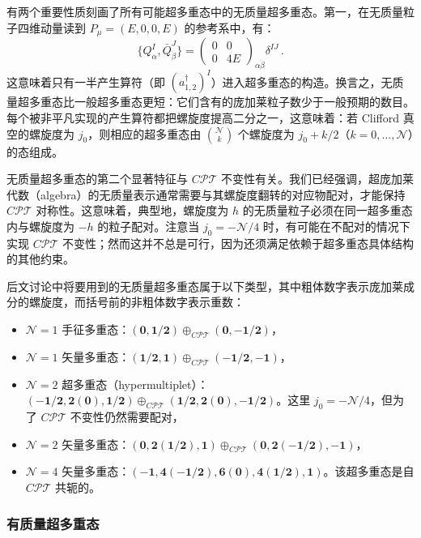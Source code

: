 有两个重要性质刻画了所有可能超多重态中的无质量超多重态。第一，在无质量粒子四维动量读到 $P_\mu=(E,0,0,E)$ 的参考系中，有：
\[
\{Q^I_\alpha,\bar Q^J_{\dot\beta}\}=\begin{pmatrix}0&0\\ 0&4E\end{pmatrix}_{\alpha\dot\beta}\delta^{IJ}\,.
\]
这意味着只有一半产生算符（即 $(a^\dagger_{1,2})^I$）进入超多重态的构造。换言之，无质量超多重态比一般超多重态更短：它们含有的庞加莱粒子数少于一般预期的数目。每个被非平凡实现的产生算符都把螺旋度提高二分之一，这意味着：若 Clifford 真空的螺旋度为 $j_0$，则相应的超多重态由 $\binom{\mathcal{N}}{k}$ 个螺旋度为 $j_0+k/2$（$k=0,\dots,\mathcal{N}$）的态组成。

无质量超多重态的第二个显著特征与 $C\mathcal{PT}$ 不变性有关。我们已经强调，超庞加莱代数（algebra）的无质量表示通常需要与其螺旋度翻转的对应物配对，才能保持 $C\mathcal{PT}$ 对称性。这意味着，典型地，螺旋度为 $h$ 的无质量粒子必须在同一超多重态内与螺旋度为 $-h$ 的粒子配对。注意当 $j_0=-\mathcal{N}/4$ 时，有可能在不配对的情况下实现 $C\mathcal{PT}$ 不变性；然而这并不总是可行，因为还须满足依赖于超多重态具体结构的其他约束。

后文讨论中将要用到的无质量超多重态属于以下类型，其中粗体数字表示庞加莱成分的螺旋度，而括号前的非粗体数字表示重数：

\begin{itemize}[leftmargin=2em]
\item $\mathcal{N}=1$ 手征多重态：$(\mathbf{0},\mathbf{1/2})\oplus_{C\mathcal{PT}}(\mathbf{0},-\mathbf{1/2})$，
\item $\mathcal{N}=1$ 矢量多重态：$(\mathbf{1/2},\mathbf{1})\oplus_{C\mathcal{PT}}(-\mathbf{1/2},-\mathbf{1})$，
\item $\mathcal{N}=2$ 超多重态（hypermultiplet）：$(-\mathbf{1/2},\mathbf{2}(\mathbf{0}),\mathbf{1/2})\oplus_{C\mathcal{PT}}(\mathbf{1/2},\mathbf{2}(\mathbf{0}),-\mathbf{1/2})$。这里 $j_0=-\mathcal{N}/4$，但为了 $C\mathcal{PT}$ 不变性仍然需要配对，
\item $\mathcal{N}=2$ 矢量多重态：$(\mathbf{0},\mathbf{2}(\mathbf{1/2}),\mathbf{1})\oplus_{C\mathcal{PT}}(\mathbf{0},\mathbf{2}(-\mathbf{1/2}),-\mathbf{1})$，
\item $\mathcal{N}=4$ 矢量多重态：$(-\mathbf{1},\mathbf{4}(-\mathbf{1/2}),\mathbf{6}(\mathbf{0}),\mathbf{4}(\mathbf{1/2}),\mathbf{1})$。该超多重态是自 $C\mathcal{PT}$ 共轭的。
\end{itemize}

\subsubsection*{有质量超多重态}

